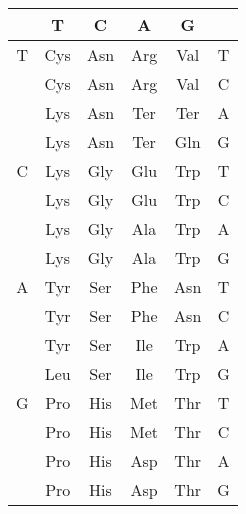 \begin{tabular}{c|cccc|c}
 & T & C & A & G\\\hline
T & Cys & Asn & Arg & Val & T\\
 & Cys & Asn & Arg & Val & C\\
 & Lys & Asn & Ter & Ter & A\\
 & Lys & Asn & Ter & Gln & G\\
C & Lys & Gly & Glu & Trp & T\\
 & Lys & Gly & Glu & Trp & C\\
 & Lys & Gly & Ala & Trp & A\\
 & Lys & Gly & Ala & Trp & G\\
A & Tyr & Ser & Phe & Asn & T\\
 & Tyr & Ser & Phe & Asn & C\\
 & Tyr & Ser & Ile & Trp & A\\
 & Leu & Ser & Ile & Trp & G\\
G & Pro & His & Met & Thr & T\\
 & Pro & His & Met & Thr & C\\
 & Pro & His & Asp & Thr & A\\
 & Pro & His & Asp & Thr & G\\
\end{tabular}

